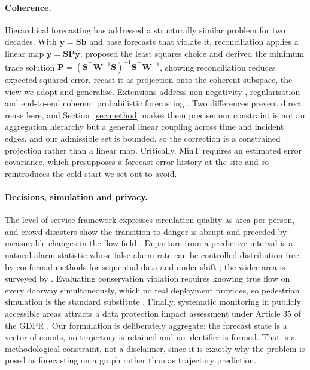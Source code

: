 \documentclass[11pt]{article}
\theoremstyle{plain}
\theoremstyle{definition}
\theoremstyle{remark}
\newcommand{\by}{\bm{y}}
\newcommand{\yhat}{\hat{\by}}
\newcommand{\ytil}{\tilde{\by}}
\begin{document}
\paragraph{Coherence.}
Hierarchical forecasting has addressed a structurally similar problem for two decades. With $\by = \bm{S}\bm{b}$ and base forecasts that violate it, reconciliation applies a linear map $\ytil = \bm{S}\bm{P}\yhat$; \citet{hyndman2011optimal} proposed the least squares choice and \citet{wickramasuriya2019mint} derived the minimum trace solution $\bm{P} = (\bm{S}^{\top}\bm{W}^{-1}\bm{S})^{-1}\bm{S}^{\top}\bm{W}^{-1}$, showing reconciliation reduces expected squared error. \citet{panagiotelis2021geometric} recast it as projection onto the coherent subspace, the view we adopt and generalise. Extensions address non-negativity \citep{wickramasuriya2020nonneg}, regularisation \citep{bentaieb2019regularized} and end-to-end coherent probabilistic forecasting \citep{rangapuram2021endtoend}. Two differences prevent direct reuse here, and Section~\ref{sec:method} makes them precise: our constraint is not an aggregation hierarchy but a general linear coupling across time and incident edges, and our admissible set is bounded, so the correction is a constrained projection rather than a linear map. Critically, MinT requires an estimated error covariance, which presupposes a forecast error history at the site and so reintroduces the cold start we set out to avoid.

\paragraph{Decisions, simulation and privacy.}
The level of service framework \citep{fruin1971} expresses circulation quality as area per person, and crowd disasters show the transition to danger is abrupt and preceded by measurable changes in the flow field \citep{helbing2007crowd}. Departure from a predictive interval is a natural alarm statistic whose false alarm rate can be controlled distribution-free by conformal methods for sequential data \citep{stankeviciute2021conformal,xu2021enbpi} and under shift \citep{gibbs2021adaptive}; the wider area is surveyed by \citet{blazquez2021review}. Evaluating conservation violation requires knowing true flow on every doorway simultaneously, which no real deployment provides, so pedestrian simulation is the standard substitute \citep{helbing1995social,seitz2012osm,kleinmeier2019vadere,jupedsim}. Finally, systematic monitoring in publicly accessible areas attracts a data protection impact assessment under Article 35 of the GDPR \citep{gdpr}. Our formulation is deliberately aggregate: the forecast state is a vector of counts, no trajectory is retained and no identifier is formed. That is a methodological constraint, not a disclaimer, since it is exactly why the problem is posed as forecasting on a graph rather than as trajectory prediction.
\end{document}

